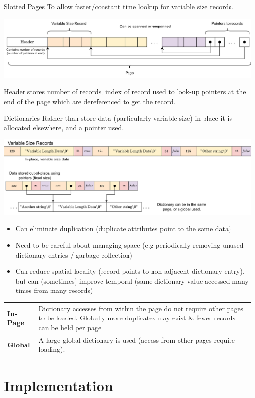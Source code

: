 \begin{definitionbox}{Slotted Pages}
    To allow faster/constant time lookup for variable size records.
    \begin{center}
        \includegraphics[width=\textwidth]{storage/images/slotted_pages.drawio.png}
    \end{center}
    Header stores number of records, index of record used to look-up pointers at the end of the page which are dereferenced to get the record.
\end{definitionbox}

\begin{definitionbox}{Dictionaries}
    Rather than store data (particularly variable-size) in-place it is allocated elsewhere, and a pointer used.
    \begin{center}
        \includegraphics[width=\textwidth]{storage/images/dictionary_layout.drawio.png}
    \end{center}
    \begin{itemize}
        \item Can eliminate duplication (duplicate attributes point to the same data)
        \item Need to be careful about managing space (e.g periodically removing unused dictionary entries / garbage collection)
        \item Can reduce spatial locality (record points to non-adjacent dictionary entry), but can (sometimes) improve temporal (same dictionary value accessed many times from many records) 
    \end{itemize}
    \begin{center}
        \begin{tabular}{l p{}}
            \textbf{In-Page} & Dictionary accesses from within the page do not require other pages to be loaded. Globally more duplicates may exist \& fewer records can be held per page. \\
            \textbf{Global} & A large global dictionary is used (access from other pages require loading). \\
        \end{tabular}
    \end{center}
\end{definitionbox}

\section{Implementation}
\unfinished
